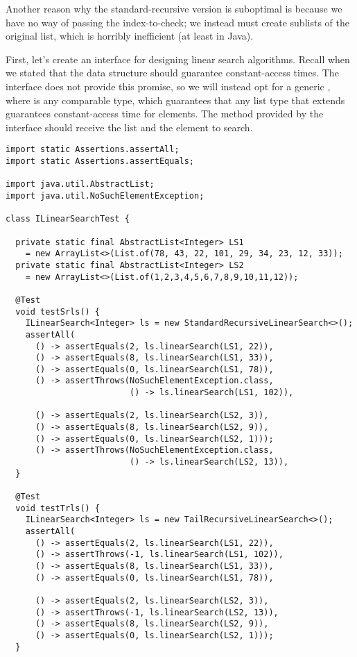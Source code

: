 Another reason why the standard-recursive version is suboptimal is because we have no way of passing the index-to-check; we instead must create sublists of the original list, which is horribly inefficient (at least in Java).

First, let's create an interface for designing linear search algorithms. 
Recall when we stated that the data structure should guarantee constant-access times. 
The  interface does not provide this promise, so we will instead opt for a generic , where  is any comparable type, which guarantees that any list type that extends  guarantees constant-access time for elements. 
The method provided by the interface should receive the list and the element to search.

\begin{lstlisting}[language=MyJava]
import static Assertions.assertAll;
import static Assertions.assertEquals;

import java.util.AbstractList;
import java.util.NoSuchElementException;

class ILinearSearchTest {

  private static final AbstractList<Integer> LS1 
    = new ArrayList<>(List.of(78, 43, 22, 101, 29, 34, 23, 12, 33));
  private static final AbstractList<Integer> LS2 
    = new ArrayList<>(List.of(1,2,3,4,5,6,7,8,9,10,11,12));

  @Test
  void testSrls() {
    ILinearSearch<Integer> ls = new StandardRecursiveLinearSearch<>();
    assertAll(
      () -> assertEquals(2, ls.linearSearch(LS1, 22)),
      () -> assertEquals(8, ls.linearSearch(LS1, 33)),
      () -> assertEquals(0, ls.linearSearch(LS1, 78)),
      () -> assertThrows(NoSuchElementException.class, 
                         () -> ls.linearSearch(LS1, 102)),

      () -> assertEquals(2, ls.linearSearch(LS2, 3)),
      () -> assertEquals(8, ls.linearSearch(LS2, 9)),
      () -> assertEquals(0, ls.linearSearch(LS2, 1)));
      () -> assertThrows(NoSuchElementException.class, 
                         () -> ls.linearSearch(LS2, 13)),
  }

  @Test
  void testTrls() {
    ILinearSearch<Integer> ls = new TailRecursiveLinearSearch<>();
    assertAll(
      () -> assertEquals(2, ls.linearSearch(LS1, 22)),
      () -> assertThrows(-1, ls.linearSearch(LS1, 102)),
      () -> assertEquals(8, ls.linearSearch(LS1, 33)),
      () -> assertEquals(0, ls.linearSearch(LS1, 78)),

      () -> assertEquals(2, ls.linearSearch(LS2, 3)),
      () -> assertThrows(-1, ls.linearSearch(LS2, 13)),
      () -> assertEquals(8, ls.linearSearch(LS2, 9)),
      () -> assertEquals(0, ls.linearSearch(LS2, 1)));
  }


\end{lstlisting}
